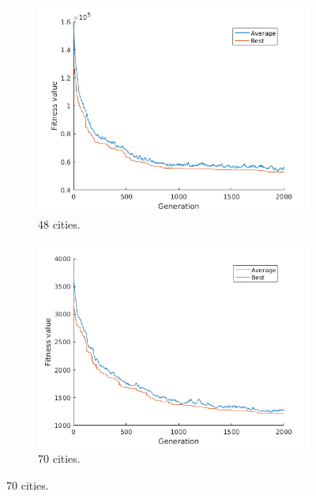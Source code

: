 \documentclass[]{article}
\begin{document}
\begin{figure}[H]
  \begin{subfigure}{0.5\textwidth}
     \centering
     \includegraphics[width=0.99\linewidth]{../GA_TSP/t148.png}
     \caption{48 cities.}
     \label{sfig:t248}
  \end{subfigure}%
  \begin{subfigure}{0.5\textwidth}
     \centering
     \includegraphics[width=0.99\linewidth]{../GA_TSP/t170.png}
     \caption{70 cities.}
     \label{sfig:t270}
  \end{subfigure}%


\end{figure}
\end{document}
